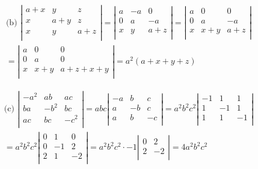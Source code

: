 \documentclass[12pt, a4paper]{article}
\begin{document}
\begin{gather*}
  \text{(b) }
  \left| \begin{array}{ccc}
    a + x & y & z\\
    x & a+y & z\\
    x & y & a+z\\
  \end{array} \right|
  = 
  \left| \begin{array}{ccc}
    a & -a & 0\\
    0 & a & -a\\
    x & y & a+z\\ 
  \end{array} \right| 
  = 
  \left| \begin{array}{ccc}
    a & 0 & 0\\
    0 & a & -a\\
    x & x+y & a+z\\ 
  \end{array} \right| \\[5pt]
  = 
  \left| \begin{array}{ccc}
    a & 0 & 0\\
    0 & a & 0\\
    x & x+y & a+z+x+y\\ 
  \end{array} \right|
  = a^2(a+x+y+z)
\end{gather*}

\begin{gather*}
  \text{(c) }
  \left| \begin{array}{ccc}
    -a^2 & ab & ac\\
    ba & -b^2 & bc\\
    ac & bc & -c^2\\
  \end{array} \right|
  = abc
  \left| \begin{array}{ccc}
    -a & b & c\\
    a & -b & c\\
    a & b & -c\\
  \end{array} \right| 
  = a^2b^2c^2
  \left| \begin{array}{ccc}
    -1 & 1 & 1\\
    1 & -1 & 1\\
    1 & 1 & -1\\
  \end{array} \right| \\[5pt]
  = a^2b^2c^2
  \left| \begin{array}{ccc}
    0 & 1 & 0\\
    0 & -1 & 2\\
    2 & 1 & -2\\ 
  \end{array} \right|
  = a^2b^2c^2 \cdot -1
  \left| \begin{array}{cc}
    0 & 2 \\
    2 & -2\\
  \end{array} \right|
  =4a^2b^2c^2
\end{gather*}
\end{document}
